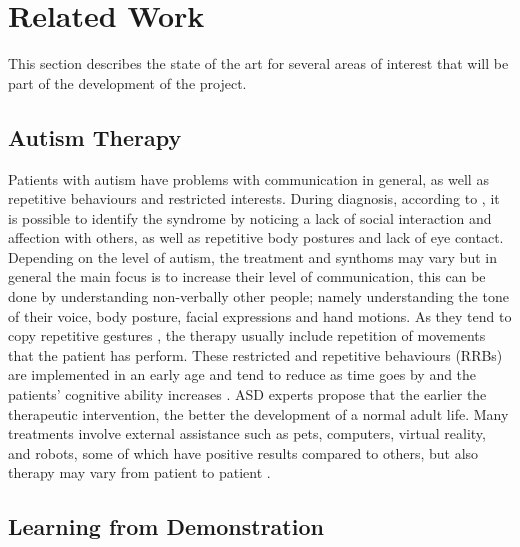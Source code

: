 \documentclass[thesis]{mas_proposal}
\begin{document}
\section{Related Work}
    
    This section describes the state of the art for several areas of interest that will be part of the development of the project.
    
    \subsection{Autism Therapy}
    
    Patients with autism have problems with communication in general, as well as repetitive behaviours and restricted interests. During diagnosis, according to \cite{Brentani2013}, it is possible to identify the syndrome by noticing a lack of social interaction and affection with others, as well as repetitive body postures and lack of eye contact.  Depending on the level of autism, the treatment and synthoms may vary but in general the main focus is to increase their level of communication, this can be done by understanding non-verbally other people; namely understanding the tone of their voice, body posture, facial expressions and hand motions. As they tend to copy repetitive gestures \cite{Dautenhahn2004}, the therapy usually include repetition of movements that the patient has perform. These restricted and repetitive behaviours (RRBs) are implemented in an early age and tend to reduce as time goes by and the patients' cognitive ability increases \cite{Leekam2011}. ASD experts propose that the earlier the therapeutic intervention, the better the development of a normal adult life. Many treatments involve external assistance such as pets, computers, virtual reality, and robots, some of which have positive results compared to others, but also therapy may vary from patient to patient \cite{Scassellati2012}.
    
    \subsection{Learning from Demonstration}
    
\end{document}
